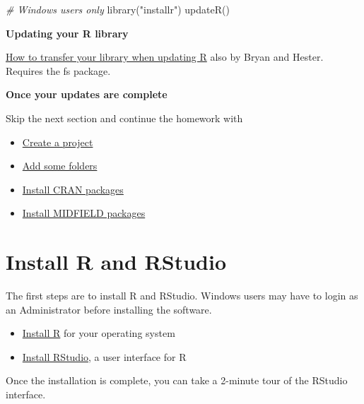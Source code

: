 \documentclass[
]{book}
\newenvironment{Shaded}{\begin{snugshade}}{\end{snugshade}}
\newcommand{\CommentTok}[1]{\textcolor[rgb]{0.56,0.35,0.01}{\textit{#1}}}
\newcommand{\FunctionTok}[1]{\textcolor[rgb]{0.00,0.00,0.00}{#1}}
\newcommand{\NormalTok}[1]{#1}
\newcommand{\StringTok}[1]{\textcolor[rgb]{0.31,0.60,0.02}{#1}}
\providecommand{\tightlist}{%
  \setlength{\itemsep}{0pt}\setlength{\parskip}{0pt}}
\begin{document}
\begin{Shaded}
\begin{Highlighting}[]
    \CommentTok{\# Windows users only}
    \FunctionTok{library}\NormalTok{(}\StringTok{"installr"}\NormalTok{)}
    \FunctionTok{updateR}\NormalTok{()}
\end{Highlighting}
\end{Shaded}

\textbf{Updating your R library}

\href{https://rstats.wtf/maintaining-r.html\#how-to-transfer-your-library-when-updating-r}{How to transfer your library when updating R} also by Bryan and Hester. Requires the fs package.

\textbf{Once your updates are complete}

Skip the next section and continue the homework with

\begin{itemize}
\tightlist
\item
  \protect\hyperlink{create-a-project}{Create a project}\\
\item
  \protect\hyperlink{add-some-folders}{Add some folders}
\item
  \protect\hyperlink{install-cran-packages}{Install CRAN packages}
\item
  \protect\hyperlink{install-midfield-packages}{Install MIDFIELD packages}
\end{itemize}

\hypertarget{install-r-and-rstudio}{%
\section{Install R and RStudio}\label{install-r-and-rstudio}}

The first steps are to install R and RStudio. Windows users may have to login as an Administrator before installing the software.

\begin{itemize}
\tightlist
\item
  \href{https://cloud.r-project.org}{Install R} for your operating system\\
\item
  \href{https://www.rstudio.com/products/rstudio/\#Desktop}{Install RStudio}, a user interface for R
\end{itemize}

Once the installation is complete, you can take a 2-minute tour of the RStudio interface.
\end{document}
